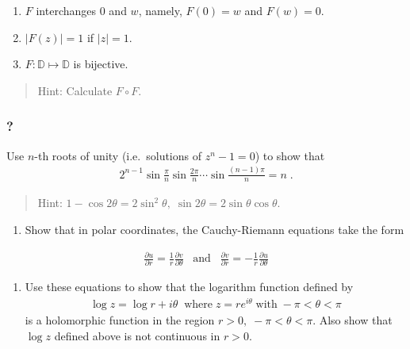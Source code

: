 \begin{enumerate}
\def\labelenumi{(\roman{enumi})}
\setcounter{enumi}{1}
\item
  \(F\) interchanges \(0\) and \(w\), namely, \(F(0) = w\) and
  \(F(w) = 0\).
\item
  \(|F(z)| = 1\) if \(|z| = 1\).
\item
  \(F: {\mathbb D} \mapsto {\mathbb D}\) is bijective.
\end{enumerate}

\begin{quote}
Hint: Calculate \(F \circ F\).
\end{quote}

\hypertarget{section-141}{%
\subsubsection{?}\label{section-141}}

Use \(n\)-th roots of unity (i.e.~solutions of \(z^n - 1 =0\)) to show
that
\begin{align*}2^{n-1} \sin\frac{\pi}{n} \sin\frac{2\pi}{n} \cdots \sin\frac{(n-1)\pi}{n}
= n
\; .\end{align*}

\begin{quote}
Hint:
\(1 - \cos 2 \theta = 2 \sin^2 \theta,\; \sin 2 \theta = 2 \sin \theta \cos \theta\).
\end{quote}

\begin{enumerate}
\def\labelenumi{(\alph{enumi})}
\tightlist
\item
  Show that in polar coordinates, the Cauchy-Riemann equations take the
  form
\end{enumerate}

\begin{align*}\frac{\partial u}{\partial r} = \frac{1}{r} \frac{\partial v}{\partial \theta}
\; \; \; \text{and} \; \; \;
\frac{\partial v}{\partial r} = - \frac{1}{r} \frac{\partial u}{\partial \theta}\end{align*}

\begin{enumerate}
\def\labelenumi{(\alph{enumi})}
\setcounter{enumi}{1}
\tightlist
\item
  Use these equations to show that the logarithm function defined by
  \begin{align*}\log z = \log r + i \theta \; \;
  \mbox{where} \; z = r e^{i \theta } \; \mbox{with} \; - \pi < \theta < \pi\end{align*}
  is a holomorphic function in the region
  \(r>0, \; - \pi < \theta < \pi\). Also show that \(\log z\) defined
  above is not continuous in \(r>0\).
\end{enumerate}

